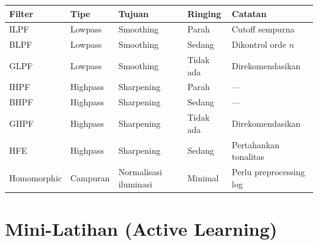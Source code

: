 \documentclass[12pt,a4paper]{article}
\begin{document}
\begin{center}
\renewcommand{\arraystretch}{1.5}
\begin{tabular}{llllp{4cm}}
\toprule
\textbf{Filter} & \textbf{Tipe} & \textbf{Tujuan} & \textbf{Ringing} & \textbf{Catatan} \\
\midrule
ILPF        & Lowpass  & Smoothing         & Parah    & Cutoff sempurna \\
BLPF        & Lowpass  & Smoothing         & Sedang   & Dikontrol orde $n$ \\
GLPF        & Lowpass  & Smoothing         & Tidak ada & Direkomendasikan \\
IHPF        & Highpass & Sharpening        & Parah    & --- \\
BHPF        & Highpass & Sharpening        & Sedang   & --- \\
GHPF        & Highpass & Sharpening        & Tidak ada & Direkomendasikan \\
HFE         & Highpass & Sharpening        & Sedang   & Pertahankan tonalitas \\
Homomorphic & Campuran & Normalisasi iluminasi & Minimal & Perlu preprocessing log \\
\bottomrule
\end{tabular}
\end{center}

\section{Mini-Latihan (Active Learning)}
\end{document}
